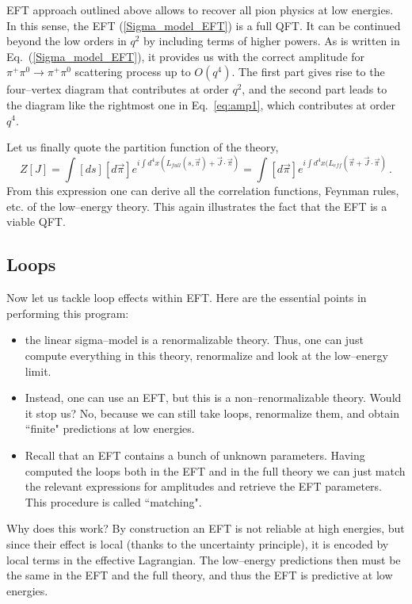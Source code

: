 \documentclass[12pt]{article}
\newcommand{\be}{\begin{equation}}
\newcommand{\ee}{\end{equation}}
\begin{document}
EFT approach outlined above allows to recover all pion physics at low energies. In this sense, the EFT (\ref{Sigma_model_EFT}) is a full QFT. It can be continued beyond the low orders in $q^2$ by including terms of higher powers. As is written in Eq.~(\ref{Sigma_model_EFT}), it provides us with the correct amplitude for $\pi^+\pi^0\rightarrow \pi^+\pi^0$ scattering process up to $O(q^4)$. The first part gives rise to the four--vertex diagram that contributes at order $q^2$, and the second part leads to the diagram like the rightmost one in Eq.~\eqref{eq:amp1}, which contributes at order~$q^4$.

Let us finally quote the partition function of the theory,
\be
Z[J]=\int [ds][d\vec{\pi}]e^{i\int d^4x(L_{full}(s,\vec{\pi})+\vec{J}\cdot\vec{\pi})}=\int [d\vec{\pi}]e^{i\int d^4x(L_{eff}(\vec{\pi}+\vec{J}\cdot\vec{\pi})}\,.
\ee
From this expression one can derive all the correlation functions, Feynman rules, etc. of the low--energy theory. This again illustrates the fact that the EFT is a viable QFT.


\subsection{Loops}

Now let us tackle loop effects within EFT.
Here are the essential points in performing this program:
\begin{itemize}
\item the linear sigma--model is a renormalizable theory. Thus, one can just compute everything in this theory, renormalize and look at the low--energy limit.
\item Instead, one can use an EFT, but this is a non--renormalizable theory. Would it stop us? No, because we can still take loops, renormalize them, and obtain ``finite" predictions at low energies.
\item Recall that an EFT contains a bunch of unknown parameters.
Having computed the loops both in the EFT and in the full theory we can just match the relevant expressions for amplitudes and retrieve the EFT parameters. This procedure is called ``matching".
\end{itemize}


Why does this work?
By construction an EFT is not reliable at high energies, but since their effect is local
(thanks to the uncertainty principle), it is encoded by local terms in the effective Lagrangian.
The low--energy predictions then must be the same in the EFT and the full theory, and thus the EFT
is predictive at low energies.
\end{document}
